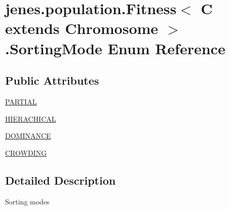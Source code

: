 \hypertarget{enumjenes_1_1population_1_1_fitness_3_01_c_01extends_01_chromosome_01_4_1_1_sorting_mode}{\section{jenes.\-population.\-Fitness$<$ C extends Chromosome $>$.Sorting\-Mode Enum Reference}
\label{enumjenes_1_1population_1_1_fitness_3_01_c_01extends_01_chromosome_01_4_1_1_sorting_mode}
}
\subsection*{Public Attributes}
\begin{DoxyCompactItemize}
\item 
\hyperlink{enumjenes_1_1population_1_1_fitness_3_01_c_01extends_01_chromosome_01_4_1_1_sorting_mode_a2cb76e719083d62c0a13a3bcb947aa72}{P\-A\-R\-T\-I\-A\-L}
\item 
\hyperlink{enumjenes_1_1population_1_1_fitness_3_01_c_01extends_01_chromosome_01_4_1_1_sorting_mode_a0c9202c48117f18a12cc3aa6a3d3ef50}{H\-I\-E\-R\-A\-C\-H\-I\-C\-A\-L}
\item 
\hyperlink{enumjenes_1_1population_1_1_fitness_3_01_c_01extends_01_chromosome_01_4_1_1_sorting_mode_a5f50d22a127c87d3cfd8a47d4d131b83}{D\-O\-M\-I\-N\-A\-N\-C\-E}
\item 
\hyperlink{enumjenes_1_1population_1_1_fitness_3_01_c_01extends_01_chromosome_01_4_1_1_sorting_mode_a1f5efadd7f291e87324ff4d662f9f7e3}{C\-R\-O\-W\-D\-I\-N\-G}
\end{DoxyCompactItemize}


\subsection{Detailed Description}
Sorting modes 

